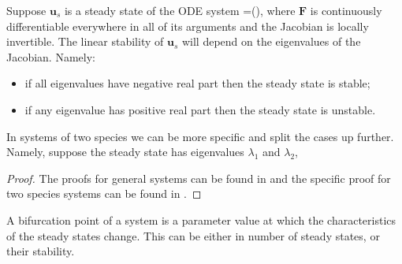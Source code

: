 \begin{thm}\label{System_stability}
Suppose $\bm{u}_s$ is a steady state of the ODE system
\bb
{}=(),\label{Vec_ODE}
\ee
where $\bm{F}$ is continuously differentiable everywhere in all of its arguments and the Jacobian is locally invertible. The linear stability of $\bm{u}_s$ will depend on the eigenvalues of the Jacobian. Namely:
\begin{itemize}
\item if all eigenvalues have negative real part then the steady state is stable;
\item if any eigenvalue has positive real part then the steady state is unstable.
\end{itemize} 

In systems of two species we can be more specific and split the cases up further. Namely, suppose the steady state has eigenvalues $\lambda_1$ and $\lambda_2$,
\begin{table}[h!!!]
\end{table}\end{thm}
\begin{proof}
The proofs for general systems can be found in  and the specific proof for two species systems can be found in .
\end{proof}

\begin{defin}
A bifurcation point of a system is a parameter value at which the characteristics of the steady states change. This can be either in number of steady states, or their stability.
\end{defin}

